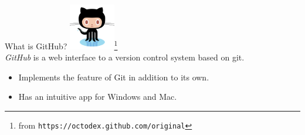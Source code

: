 \documentclass[10pt]{beamer}
\begin{document}
\begin{frame}{What is GitHub?}
\includegraphics[height=2cm]{images/octocat.png}\footnote{from \tt{https://octodex.github.com/original}}\\
\emph{GitHub} is a web interface to a version control system based on git. 
\begin{itemize}
\item Implements the feature of Git in addition to its own.
\item Has an intuitive app for Windows and Mac.
\end{itemize}

\end{frame}


\end{document}
